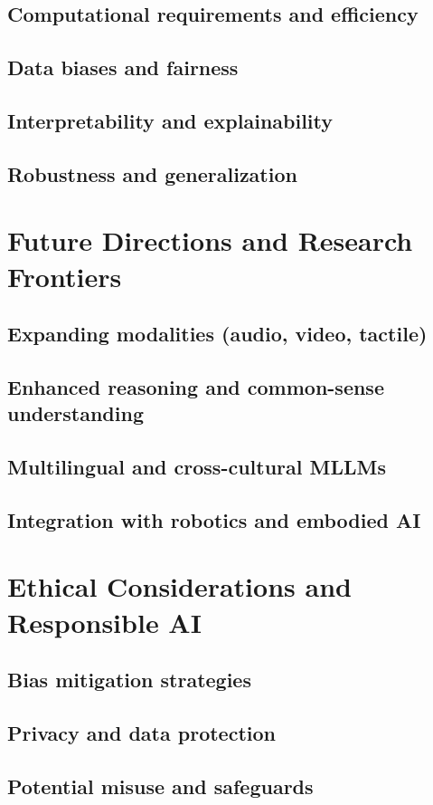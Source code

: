 \documentclass{book}
\begin{document}
\section{Computational requirements and efficiency}
\section{Data biases and fairness}
\section{Interpretability and explainability}
\section{Robustness and generalization}

\chapter{Future Directions and Research Frontiers}
\section{Expanding modalities (audio, video, tactile)}
\section{Enhanced reasoning and common-sense understanding}
\section{Multilingual and cross-cultural MLLMs}
\section{Integration with robotics and embodied AI}

\chapter{Ethical Considerations and Responsible AI}
\section{Bias mitigation strategies}
\section{Privacy and data protection}
\section{Potential misuse and safeguards}
\end{document}
